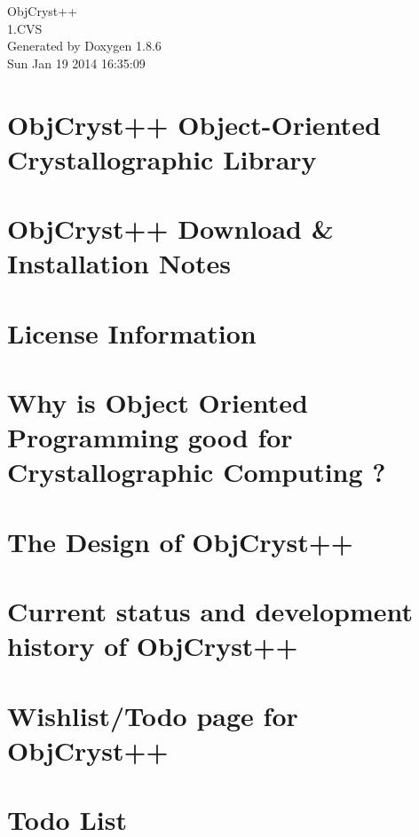 \documentclass[twoside]{article}
\begin{document}
\begin{titlepage}
\vspace*{7cm}
\begin{center}%
{\Large Obj\-Cryst++ \\[1ex]\large 1.\-C\-V\-S }\\
\vspace*{1cm}
{\large Generated by Doxygen 1.8.6}\\
\vspace*{0.5cm}
{\small Sun Jan 19 2014 16:35:09}\\
\end{center}
\end{titlepage}
\tableofcontents
{}

\section{Obj\-Cryst++ Object-\/\-Oriented Crystallographic Library}
\label{index}
\section{Obj\-Cryst++ Download \& Installation Notes}
\label{a00002}

\section{License Information}
\label{a00004}

\section{Why is Object Oriented Programming good for Crystallographic Computing ?}
\label{a00006}

\section{The Design of Obj\-Cryst++}
\label{a00008}

\section{Current status and development history of Obj\-Cryst++}
\label{a00010}

\section{Wishlist/\-Todo page for Obj\-Cryst++}
\label{a00012}

\section{Todo List}
\label{a00229}

\end{document}
